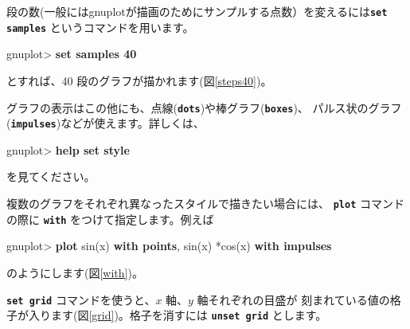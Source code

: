 \documentclass[a4j]{ujarticle} %
\newenvironment{terminal}{%
  \begin{center}
   \begin{minipage}{.8\textwidth}
    \setlength{\FrameSep}{.5\FrameSep}%
    \begin{framed}\ttfamily\small%
     \setlength\baselineskip{.85\baselineskip}%
}{%
    \end{framed}
   \end{minipage}
  \end{center}%
}
\begin{document}
段の数(一般にはgnuplotが描画のためにサンプルする点数）を変えるには{\tt\bf set samples} というコマンドを用います。
\begin{terminal}
gnuplot> {\bf set samples 40}
\end{terminal}
とすれば、40 段のグラフが描かれます(図\ref{steps40})。

グラフの表示はこの他にも、点線({\tt\bf dots})や棒グラフ({\tt\bf boxes})、
パルス状のグラフ({\tt\bf impulses})などが使えます。詳しくは、
\begin{terminal}
gnuplot> {\bf help set style}
\end{terminal}
を見てください。

複数のグラフをそれぞれ異なったスタイルで描きたい場合には、
{\tt\bf plot} コマンドの際に {\tt\bf with} をつけて指定します。例えば
\begin{terminal}
gnuplot> {\bf plot} sin(x) {\bf with points}, sin(x)%
*cos(x) {\bf with impulses}
\end{terminal}
のようにします(図\ref{with})。

{\tt\bf set grid} コマンドを使うと、$x$ 軸、$y$ 軸それぞれの目盛が
刻まれている値の格子が入ります(図\ref{grid})。格子を消すには {\tt\bf unset grid} とします。
\end{document}
